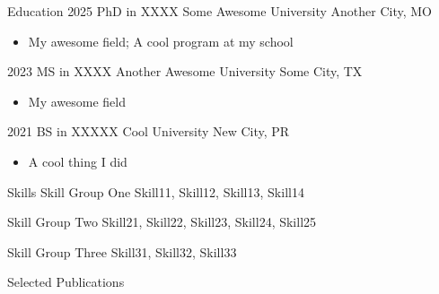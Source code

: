 \documentclass[letterpaper,11pt,twoside]{drevoresumecv}
\begin{document}
\begin{cvsection}{Education}
  \cveducation
    {2025}
    {PhD in XXXX}
    {Some Awesome University}
    {Another City, MO}
    {
      {
        \begin{itemize}[leftmargin=0.6cm, label={}, before=\vspace{-1pt}, after=\vspace{3pt}]
	  \item {\sffamily{}} My awesome field; {\sffamily{}} A cool program at my school
        \end{itemize}
      }
    }

  \cveducation
    {2023}
    {MS in XXXX}
    {Another Awesome University}
    {Some City, TX}
    {
      {
        \begin{itemize}[leftmargin=0.6cm, label={}, before=\vspace{-1pt}, after=\vspace{3pt}]
	  \item {\sffamily{}} My awesome field
        \end{itemize}
      }
    }

  \cveducation
    {2021}
    {BS in XXXXX}
    {Cool University}
    {New City, PR}
    {
      {
        \begin{itemize}[leftmargin=0.6cm, label={}, before=\vspace{-1pt}, after=\vspace{3pt}]
	  \item {\sffamily{}} A cool thing I did
        \end{itemize}
      }
    }
\end{cvsection}


\begin{cvsection}{Skills}
  \cvskilllist
    {Skill Group One}
    {Skill11, Skill12, Skill13, Skill14}

  \cvskilllist
    {Skill Group Two}
    {Skill21, Skill22, Skill23, Skill24, Skill25}
    
  \cvskilllist
    {Skill Group Three}
    {Skill31, Skill32, Skill33}
\end{cvsection}



\begin{cvsection}{Selected Publications}
\nocite{*}{\printbibliography[heading=none]}  %
\end{cvsection}
\end{document}
